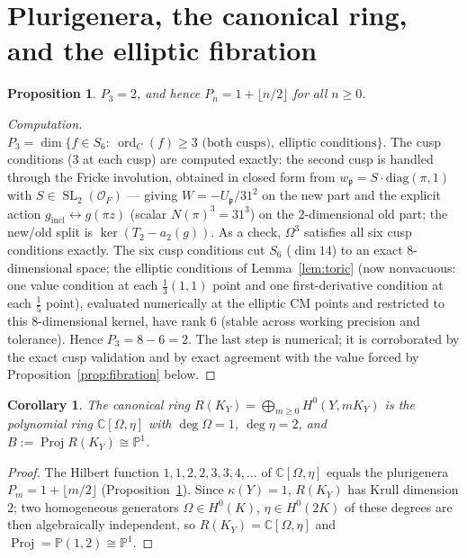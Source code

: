 \documentclass[11pt]{article}
\newtheorem{proposition}[theorem]{Proposition}
\newtheorem{corollary}[theorem]{Corollary}
\theoremstyle{definition}
\DeclareMathOperator{\ord}{ord}
\DeclareMathOperator{\Proj}{Proj}
\DeclareMathOperator{\SL}{SL}
\newcommand{\bP}{\mathbb{P}}
\newcommand{\bC}{\mathbb{C}}
\newcommand{\cO}{\mathcal{O}}
\newcommand{\fp}{\mathfrak{p}}
\newcommand{\Om}{\Omega}
\begin{document}
\section{Plurigenera, the canonical ring, and the elliptic fibration}

\begin{proposition}\label{prop:P3}
$P_3=2$, and hence $P_n=1+\lfloor n/2\rfloor$ for all $n\ge0$.
\end{proposition}

\begin{proof}[Computation]
$P_3=\dim\{f\in S_6:\ \ord_C(f)\ge3\text{ (both cusps)},\ \text{elliptic
conditions}\}$. The cusp conditions ($3$ at each cusp) are computed exactly:
the second cusp is handled through the Fricke involution, obtained in closed
form from $w_\fp=S\cdot\mathrm{diag}(\pi,1)$ with $S\in\SL_2(\cO_F)$ --- giving
$W=-U_\fp/31^2$ on the new part and the explicit action
$g_{\mathrm{incl}}\leftrightarrow g(\pi z)$ (scalar $N(\pi)^{3}=31^3$) on the
$2$-dimensional old part; the new/old split is $\ker(T_2-a_2(g))$. As a check,
$\Om^3$ satisfies all six cusp conditions exactly. The six cusp conditions cut
$S_6$ ($\dim14$) to an exact $8$-dimensional space; the elliptic conditions of
Lemma~\ref{lem:toric} (now nonvacuous: one value condition at each
$\tfrac13(1,1)$ point and one first-derivative condition at each $\tfrac15$
point), evaluated numerically at the elliptic CM points and restricted to this
$8$-dimensional kernel, have rank $6$ (stable across working precision and
tolerance). Hence $P_3=8-6=2$. The last step is numerical; it is corroborated
by the exact cusp validation and by exact agreement with the value forced by
Proposition~\ref{prop:fibration} below.
\end{proof}

\begin{corollary}\label{cor:canring}
The canonical ring $R(K_Y)=\bigoplus_{m\ge0}H^0(Y,mK_Y)$ is the polynomial ring
$\bC[\Om,\eta]$ with $\deg\Om=1$, $\deg\eta=2$, and $B:=\Proj R(K_Y)\cong\bP^1$.
\end{corollary}

\begin{proof}
The Hilbert function $1,1,2,2,3,3,4,\dots$ of $\bC[\Om,\eta]$ equals the
plurigenera $P_m=1+\lfloor m/2\rfloor$ (Proposition~\ref{prop:P3}). Since
$\kappa(Y)=1$, $R(K_Y)$ has Krull dimension $2$; two homogeneous generators
$\Om\in H^0(K)$, $\eta\in H^0(2K)$ of these degrees are then algebraically
independent, so $R(K_Y)=\bC[\Om,\eta]$ and $\Proj=\bP(1,2)\cong\bP^1$.
\end{proof}
\end{document}
